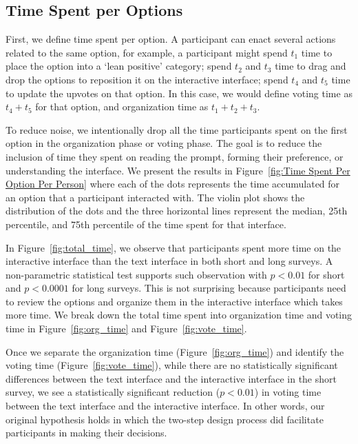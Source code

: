 \subsection{Time Spent per Options}
First, we define time spent per option. A participant can enact several actions related to the same option, for example, a participant might spend $t_1$ time to place the option into a `lean positive' category; spend $t_2$ and $t_3$ time to drag and drop the options to reposition it on the interactive interface; spend $t_4$ and $t_5$ time to update the upvotes on that option. In this case, we would define voting time as $t_4 + t_5$ for that option, and organization time as $t_1 + t_2 + t_3$.

To reduce noise, we intentionally drop all the time participants spent on the first option in the organization phase or voting phase. The goal is to reduce the inclusion of time they spent on reading the prompt, forming their preference, or understanding the interface. We present the results in Figure~\ref{fig:Time Spent Per Option Per Person} where each of the dots represents the time accumulated for an option that a participant interacted with. The violin plot shows the distribution of the dots and the three horizontal lines represent the median, 25th percentile, and 75th percentile of the time spent for that interface.

In Figure~\ref{fig:total_time}, we observe that participants spent more time on the interactive interface than the text interface in both short and long surveys. A non-parametric statistical test supports such observation with $p<0.01$ for short and $p<0.0001$ for long surveys. This is not surprising because participants need to review the options and organize them in the interactive interface which takes more time. We break down the total time spent into organization time and voting time in Figure~\ref{fig:org_time} and Figure~\ref{fig:vote_time}.

Once we separate the organization time (Figure~\ref{fig:org_time}) and identify the voting time (Figure~\ref{fig:vote_time}), while there are no statistically significant differences between the text interface and the interactive interface in the short survey, we see a statistically significant reduction ($p<0.01$) in voting time between the text interface and the interactive interface. In other words, our original hypothesis holds in which the two-step design process did facilitate participants in making their decisions.

